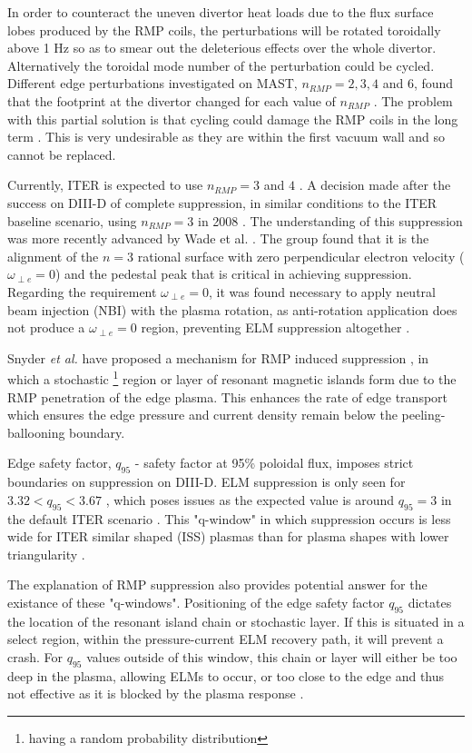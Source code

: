\documentclass[12pt]{article}  %
\begin{document}
In order to counteract the uneven divertor heat loads due to the flux surface lobes produced by the RMP coils, the perturbations will be rotated toroidally above 1 Hz \cite{LoarteTR2013} so as to smear out the deleterious effects over the whole divertor. Alternatively the toroidal mode number of the perturbation could be cycled. Different edge perturbations investigated on MAST, $n_{RMP}=2,3,4$ and $6$, found that the footprint at the divertor changed for each value of $n_{RMP}$ \cite{Chapman2014}. The problem with this partial solution is that cycling could damage the RMP coils in the long term \cite{KirkFF}. This is very undesirable as they are within the first vacuum wall and so cannot be replaced. 

Currently, ITER is expected to use $n_{RMP} = 3$ and $4$ \cite{Chapman2014}. A decision made after the success on DIII-D of complete suppression, in similar conditions to the ITER baseline scenario, using $n_{RMP}=3$ in 2008 \cite{Evans2008, Fenstermacher2008}. The understanding of this suppression was more recently advanced by Wade et al. \cite{Wade2015}. The group found that it is the alignment of the $n=3$ rational surface with zero perpendicular electron velocity ($\omega_{\perp e} = 0$) and the pedestal peak that is critical in achieving suppression. Regarding the requirement $\omega_{\perp e} =0$, it was found necessary to apply neutral beam injection (NBI) with the plasma rotation, as anti-rotation application does not produce a $\omega_{\perp e} = 0$ region, preventing ELM suppression altogether \cite{Wade2015}.

Snyder \textit{et al.} have proposed a mechanism for RMP induced suppression \cite{Snyder2012}, in which a stochastic \footnote{having a random probability distribution} region or layer of resonant magnetic islands form due to the RMP penetration of the edge plasma. This enhances the rate of edge transport which ensures the edge pressure and current density remain below the peeling-ballooning boundary.

Edge safety factor, $q_{95}$ - safety factor at 95\% poloidal flux, imposes strict boundaries on suppression on DIII-D. ELM suppression is only seen for $3.32 < q_{95} < 3.67$ \cite{Fenstermacher2008}, which poses issues as the expected value is around $q_{95} = 3$ in the default ITER scenario \cite{Gormezano2007}. This "q-window" in which suppression occurs is less wide for ITER similar shaped (ISS) plasmas than for plasma shapes with lower triangularity \cite{Evans2008}. 

The explanation \cite{Snyder2012} of RMP suppression also provides potential answer for the existance of these "q-windows". Positioning of the edge safety factor $q_{95}$ dictates the location of the resonant island chain or stochastic layer. If this is situated in a select region, within the pressure-current ELM recovery path, it will prevent a crash. For $q_{95}$ values outside of this window, this chain or layer will either be too deep in the plasma, allowing ELMs to occur, or too close to the edge and thus not effective as it is blocked by the plasma response \cite{Snyder2012}.
\end{document}
